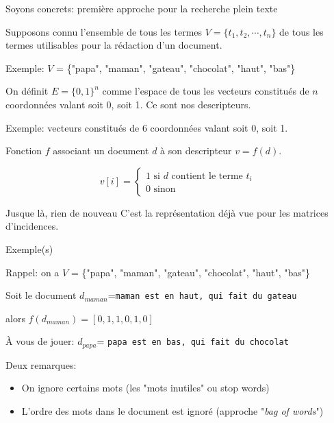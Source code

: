 \begin{frame}{Soyons concrets: première approche pour la recherche plein texte}

Supposons connu l'ensemble de tous les termes $V=\{t_1, t_2, \cdots, t_n\}$
 de tous les termes utilisables pour la rédaction d'un
document.

\vfill

Exemple: $V$ = \{"papa", "maman", "gateau", "chocolat", "haut", "bas"\}

\vfill

On définit $E=\{0, 1\}^{n}$ comme l'espace de tous les vecteurs
constitués de $n$ coordonnées valant soit 0, soit 1. Ce sont nos descripteurs.

\vfill

Exemple: vecteurs  constitués de 6 coordonnées valant soit 0, soit 1. 

\vfill

Fonction $f$ associant  un document $d$ à son descripteur $v = f(d)$.

\[
      v[i] = \left\{
                \begin{array}{ll}
                  1 \text{ si $d$ contient le terme $t_i$}\\
                  0 \text{ sinon}
                \end{array}
              \right.
\]

\begin{block}{Jusque là, rien de nouveau}
C'est la représentation déjà vue pour les matrices d'incidences.
\end{block}
\end{frame}

\begin{frame}{Exemple(s)}

Rappel: on a $V$ = \{"papa", "maman", "gateau", "chocolat", "haut", "bas"\}

\vfill


Soit le document $d_{maman}$=\texttt{maman est en haut, qui fait du gateau}

\vfill

alors $f(d_{maman}) = [0, 1, 1, 0, 1, 0]$

\begin{exoblock}
À vous de jouer: $d_{papa}$= \texttt{papa est en bas, qui fait du chocolat}
\end{exoblock}
 
\vfill

Deux remarques:

\begin{itemize}
  \item On ignore certains mots (les "mots inutiles" ou \alert{stop words})
  \item L'ordre des mots dans le document est \alert{ignoré} (approche "\textit{bag of words}")
\end{itemize}

\end{frame}

